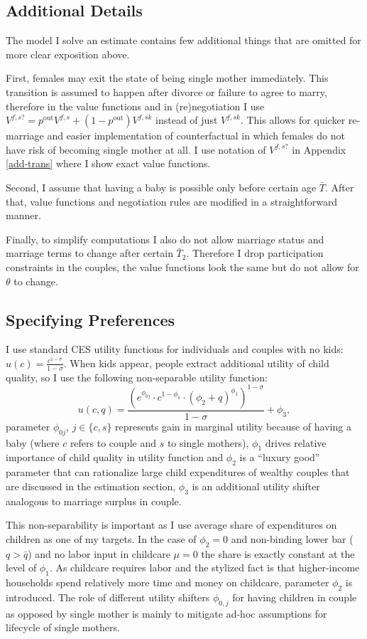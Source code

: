 \subsection{Additional Details}
The model I solve an estimate contains few additional things that are omitted for more clear exposition above.

First, females may exit the state of being single mother immediately. This transition is assumed to happen after divorce or failure to agree to marry, therefore in the value functions and in (re)negotiation I use $V^{f,s?} = p^{\text{out}} V^{f,s} + (1-p^{\text{out}})V^{f,sk}$ instead of just $V^{f,sk}$. This allows for quicker re-marriage and easier implementation of counterfactual in which females do not have risk of becoming single mother at all. I use notation of $V^{f,s?}$ in Appendix \ref{add-trans} where I show exact value functions.

Second, I assume that having a baby is possible only before certain age $\bar{T}$. After that, value functions and negotiation rules are modified in a straightforward manner.

Finally, to simplify computations I also do not allow marriage status and marriage terms to change after certain $\bar{T}_2$. Therefore I drop participation constraints in the couples, the value functions look the same but do not allow for $\theta$ to change.

\subsection{Specifying Preferences\label{prefs}}
I use standard CES utility functions for individuals and couples with no kids: $u(c) = \frac{c^{1-\sigma}}{1-\sigma}$.  When kids appear, people extract additional utility of child quality, so I use the following non-separable utility function:
\[u(c,q) = \frac{\left(e^{\phi_{0j}}\cdot c^{1-\phi_1} \cdot (\phi_2 + q)^{\phi_1}\right)^{1-\sigma}}{1-\sigma} + \phi_3,\]
parameter $\phi_{0j}$, $j \in \{c,s\}$ represents gain in marginal utility because of having a baby (where $c$ refers to couple and $s$ to single mothers), $\phi_1$ drives relative importance of child quality in utility function and $\phi_2$ is a ``luxury good'' parameter that can rationalize large child expenditures of wealthy couples that are discussed in the estimation section, $\phi_3$ is an additional utility shifter analogous to marriage surplus in couple.

This non-separability is important as I use average share of expenditures on children as one of my targets. In the case of $\phi_2 = 0$ and non-binding lower bar ($q > \bar{q}$) and no labor input in childcare $\mu = 0$ the share is exactly constant at the level of $\phi_1$. As childcare requires labor and the stylized fact is that higher-income households spend relatively more time and money on childcare, parameter $\phi_2$ is introduced. The role of different utility shifters $\phi_{0,j}$ for having children in couple as opposed by single mother is mainly to mitigate ad-hoc assumptions for lifecycle of single mothers. 

